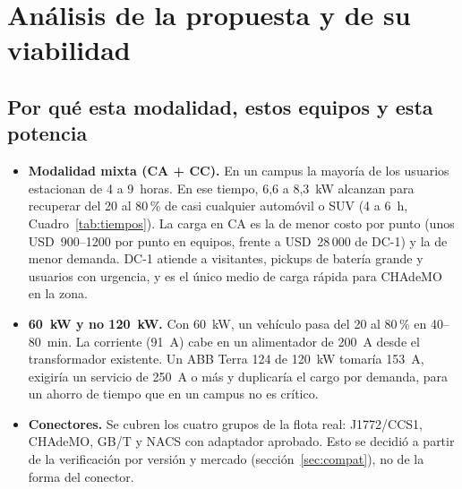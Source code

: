 \section{Análisis de la propuesta y de su viabilidad}
\label{sec:analisis}

\subsection{Por qué esta modalidad, estos equipos y esta potencia}
\begin{itemize}
\item \textbf{Modalidad mixta (CA + CC).} En un campus la mayoría de los usuarios estacionan de 4 a 9~horas. En ese tiempo, 6,6 a 8,3~kW alcanzan para recuperar del 20 al 80\,\% de casi cualquier automóvil o SUV (4 a 6~h, Cuadro~\ref{tab:tiempos}). La carga en CA es la de menor costo por punto (unos USD~900--1200 por punto en equipos, frente a USD~28\,000 de DC-1) y la de menor demanda. DC-1 atiende a visitantes, pickups de batería grande y usuarios con urgencia, y es el único medio de carga rápida para CHAdeMO en la zona.
\item \textbf{60~kW y no 120~kW.} Con 60~kW, un vehículo pasa del 20 al 80\,\% en 40--80~min. La corriente (91~A) cabe en un alimentador de 200~A desde el transformador existente. Un ABB Terra 124 de 120~kW tomaría 153~A, exigiría un servicio de 250~A o más y duplicaría el cargo por demanda, para un ahorro de tiempo que en un campus no es crítico.
\item \textbf{Conectores.} Se cubren los cuatro grupos de la flota real: J1772/CCS1, CHAdeMO, GB/T y NACS con adaptador aprobado. Esto se decidió a partir de la verificación por versión y mercado (sección~\ref{sec:compat}), no de la forma del conector.
\end{itemize}

